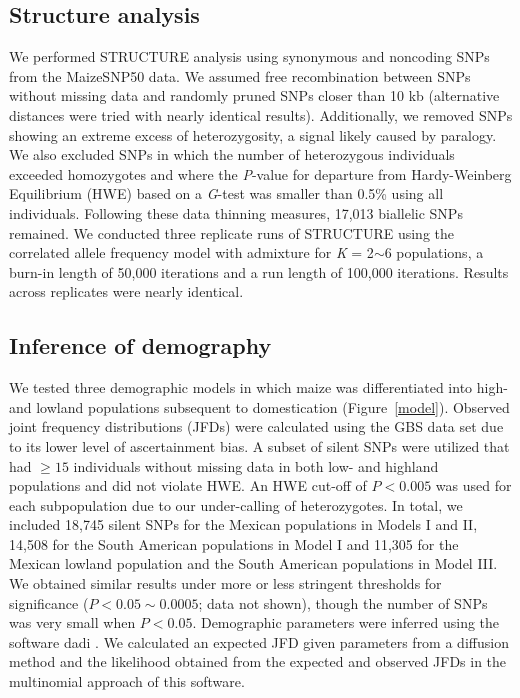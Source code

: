 \subsection*{Structure analysis}
We performed {\sf STRUCTURE} analysis \cite[]{Pritchard_2000_10835412,Falush_2003_12930761} using  synonymous and noncoding SNPs from the MaizeSNP50 data. 
We assumed free recombination between SNPs without missing data and randomly pruned SNPs closer than 10 kb (alternative distances were tried with nearly identical results). 
Additionally, we removed SNPs showing an extreme excess of heterozygosity, a signal likely caused by paralogy. 
We also excluded SNPs in which the number of heterozygous individuals exceeded homozygotes and where the \emph{P}-value for departure from Hardy-Weinberg Equilibrium (HWE) based on a \emph{G}-test was smaller than 0.5\% using all individuals. 
Following these data thinning measures, 17,013 biallelic SNPs remained. 
We conducted three replicate runs of {\sf STRUCTURE} using the correlated allele frequency model with admixture for \emph{K} = 2$\sim$6 populations, a burn-in length of 50,000 iterations and a run length of 100,000 iterations. 
Results across replicates were nearly identical.
 

\subsection*{Inference of demography}

We tested three demographic models in which maize was differentiated into high- and lowland populations subsequent to domestication (Figure~\ref{model}). 
Observed joint frequency distributions (JFDs) were calculated using the GBS data set due to its lower level of ascertainment bias. 
A subset of silent SNPs were utilized that had $\geq15$ individuals without missing data in both low- and highland populations and did not violate HWE.  
An HWE cut-off of $P<0.005$ was used for each subpopulation due to our under-calling of heterozygotes. 
In total, we included 18,745 silent SNPs for the Mexican populations in Models I and II, 14,508 for the South American populations in Model I and 11,305 for the Mexican lowland population and the South American populations in Model III.  
We obtained similar results under more or less stringent thresholds for significance ($P < 0.05\sim0.0005$; data not shown), though the number of SNPs was very small when $P<0.05$.  
Demographic parameters were inferred using the software {\sf dadi} \cite[]{Gutenkunst_2009_19851460}.  We calculated an expected JFD given parameters from a diffusion method and the likelihood obtained from the expected and observed JFDs in the multinomial approach of this software. \\


